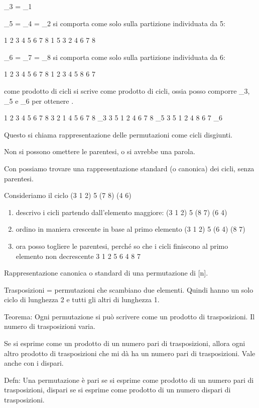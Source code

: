 \mu_3 = \mu_1

\mu_5 = \mu_4 = \mu_2 si comporta come \mu solo sulla partizione individuata da 5:

1 2 3 4 5 6 7 8
1 5 3 2 4 6 7 8

\mu_6 = \mu_7 = \mu_8 si comporta come \mu solo sulla partizione individuata da 6:

1 2 3 4 5 6 7 8
1 2 3 4 5 8 6 7

\mu come prodotto di cicli si scrive come prodotto di cicli, ossia posso comporre \mu_3, \mu_5 e \mu_6 per ottenere \mu.

1 2 3 4 5 6 7 8
3 2 1 4 5 6 7 8 \mu_3
3 5 1 2 4 6 7 8 \mu_5
3 5 1 2 4 8 6 7 \mu_6

Questo si chiama rappresentazione delle permutazioni come cicli disgiunti.

Non si possono omettere le parentesi, o si avrebbe una parola.

Con  possiamo trovare una rappresentazione standard (o canonica) dei cicli, senza parentesi.

Consideriamo il ciclo (3 1 2) 5 (7 8) (4 6)

\begin{enumerate}
    \item descrivo i cicli partendo dall'elemento maggiore:
    (3 1 2) 5 (8 7) (6 4)
    \item ordino in maniera crescente in base al primo elemento
    (3 1 2) 5 (6 4) (8 7)
    \item ora posso togliere le parentesi, perch\'e so che i cicli finiscono al primo elemento non decrescente
    3 1 2 5 6 4 8 7
\end{enumerate}

Rappresentazione canonica o standard di una permutazione di [n].

Trasposizioni = permutazioni che scambiano due elementi. Quindi hanno un solo ciclo di lunghezza 2 e tutti gli altri di lunghezza 1.

Teorema:
Ogni permutazione si pu\`o scrivere come un prodotto di trasposizioni. Il numero di trasposizioni varia.

Se \sigma si esprime come un prodotto di un numero pari di trasposizioni, allora ogni altro prodotto di trasposizioni che mi d\`a \sigma ha un numero pari di trasposizioni. Vale anche con i dispari.

Defn:
Una permutazione \`e pari se si esprime come prodotto di un numero pari di trasposizioni, dispari se si esprime come prodotto di un numero dispari di trasposizioni.

